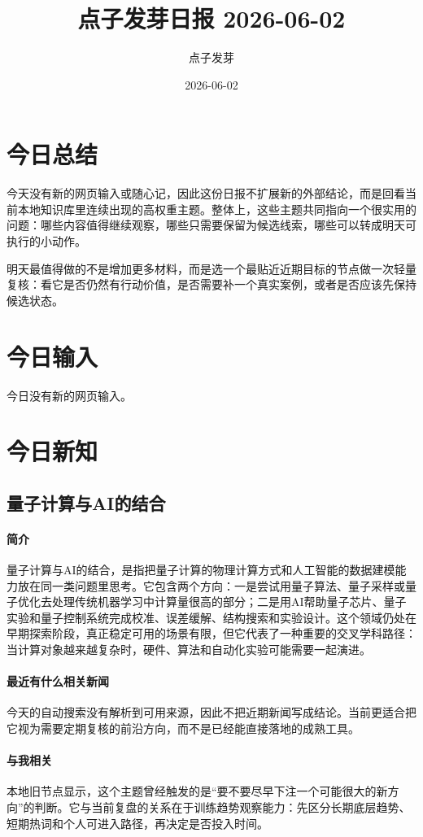 \documentclass[UTF8,zihao=-4]{ctexart}
\title{\bfseries 点子发芽日报 2026-06-02}
\author{点子发芽}
\date{2026-06-02}
\begin{document}
\maketitle
\section*{今日总结}
今天没有新的网页输入或随心记，因此这份日报不扩展新的外部结论，而是回看当前本地知识库里连续出现的高权重主题。整体上，这些主题共同指向一个很实用的问题：哪些内容值得继续观察，哪些只需要保留为候选线索，哪些可以转成明天可执行的小动作。

明天最值得做的不是增加更多材料，而是选一个最贴近近期目标的节点做一次轻量复核：看它是否仍然有行动价值，是否需要补一个真实案例，或者是否应该先保持候选状态。
\section*{今日输入}
今日没有新的网页输入。
\section*{今日新知}
\subsection*{量子计算与AI的结合}
\paragraph{简介} 量子计算与AI的结合，是指把量子计算的物理计算方式和人工智能的数据建模能力放在同一类问题里思考。它包含两个方向：一是尝试用量子算法、量子采样或量子优化去处理传统机器学习中计算量很高的部分；二是用AI帮助量子芯片、量子实验和量子控制系统完成校准、误差缓解、结构搜索和实验设计。这个领域仍处在早期探索阶段，真正稳定可用的场景有限，但它代表了一种重要的交叉学科路径：当计算对象越来越复杂时，硬件、算法和自动化实验可能需要一起演进。
\paragraph{最近有什么相关新闻} 今天的自动搜索没有解析到可用来源，因此不把近期新闻写成结论。当前更适合把它视为需要定期复核的前沿方向，而不是已经能直接落地的成熟工具。
\paragraph{与我相关} 本地旧节点显示，这个主题曾经触发的是“要不要尽早下注一个可能很大的新方向”的判断。它与当前复盘的关系在于训练趋势观察能力：先区分长期底层趋势、短期热词和个人可进入路径，再决定是否投入时间。
\end{document}

